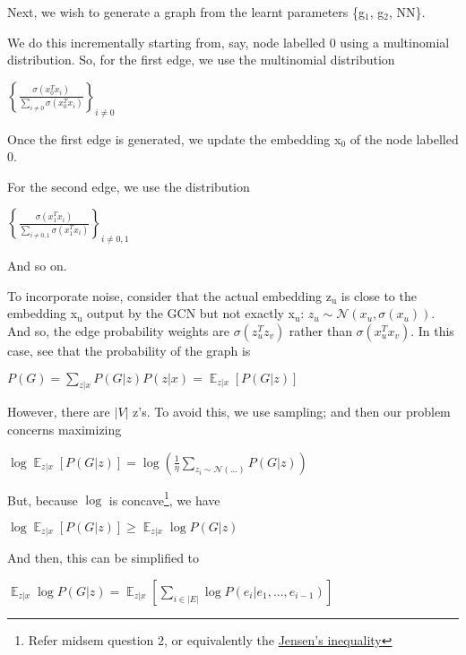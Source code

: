 \documentclass{article}
\begin{document}
Next, we wish to generate a graph from the learnt parameters \{g\(_{\text{1}}\), g\(_{\text{2}}\), NN\}. 

We do this incrementally starting from, say, node labelled 0 using a multinomial distribution. So, for the first edge, we use the multinomial distribution

\begin{center}
\(\displaystyle \left\{ \frac {\sigma(x_0^T x_i)} {\sum_{i \neq 0} \sigma(x_0^T x_i)} \right\}_{i \neq 0}\)
\end{center}

Once the first edge is generated, we update the embedding x\(_{\text{0}}\) of the node labelled 0.

For the second edge, we use the distribution

\begin{center}
\(\displaystyle \left\{ \frac {\sigma(x_1^T x_i)} {\sum_{i \neq 0,1} \sigma(x_1^T x_i)} \right\}_{i \neq 0, 1}\)
\end{center}

And so on.

To incorporate noise, consider that the actual embedding z\(_{\text{u}}\) is close to the embedding x\(_{\text{u}}\) output by the GCN but not exactly x\(_{\text{u}}\): \(z_u \sim \mathcal N(x_u, \sigma(x_u))\). And so, the edge probability weights are \(\sigma(z_u^T z_v)\) rather than \(\sigma(x_u^T x_v)\). In this case, see that the probability of the graph is

\begin{center}
\(\displaystyle P(G) =  \sum_{z|x} P(G|z) P(z|x) = \mathop {\mathbb E}_{z|x} [P(G|z)]\) 
\end{center}

However, there are \(|V|\) z's. To avoid this, we use sampling; and then our problem concerns maximizing

\begin{center}
\(\displaystyle \log \mathop {\mathbb E}_{z|x} [P(G|z)] = \log \left( \frac 1{\eta} \sum_{z_i \sim \mathcal N(...)} P(G|z) \right)\)
\end{center}

But, because \(\log\) is concave\footnote{Refer midsem question 2, or equivalently the \href{https://en.wikipedia.org/wiki/Jensen\%2527s\_inequality}{Jensen's inequality}}, we have

\begin{center}
\(\displaystyle \log \mathop {\mathbb E}_{z|x} [P(G|z)] \geq \mathop {\mathbb E}_{z|x} \log P(G|z)\)
\end{center}

And then, this can be simplified to

\begin{center}
\(\displaystyle \mathop {\mathbb E}_{z|x} \log P(G|z)
= \mathop {\mathbb E}_{z|x} \left[ \sum_{i \in |E|} \log P(e_i | e_1, ..., e_{i-1}) \right]\)
\end{center}
\end{document}
